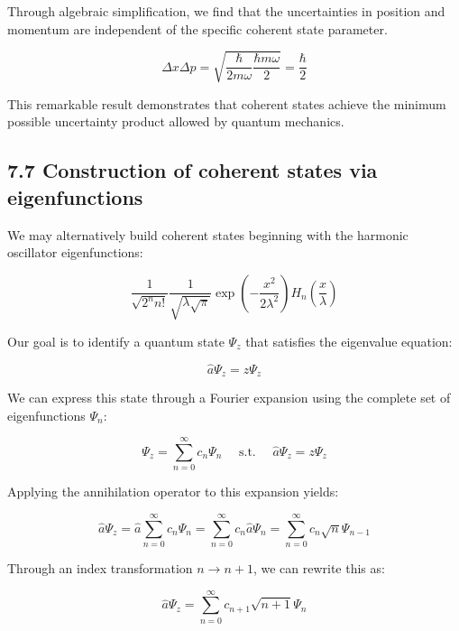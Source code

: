 \documentclass[italian]{HKNdocument}
\begin{document}
Through algebraic simplification, we find that the uncertainties in position and momentum are independent of the specific coherent state parameter.

\begin{equation*}
\Delta x \Delta p=\sqrt{\frac{\hbar}{2 m \omega} \frac{\hbar m \omega}{2}}=\frac{\hbar}{2} \tag{7.75}
\end{equation*}

This remarkable result demonstrates that coherent states achieve the minimum possible uncertainty product allowed by quantum mechanics.

\subsection*{7.7 Construction of coherent states via eigenfunctions}
We may alternatively build coherent states beginning with the harmonic oscillator eigenfunctions:

\begin{equation*}
\frac{1}{\sqrt{2^{n} n!}} \frac{1}{\sqrt{\lambda \sqrt{\pi}}} \exp \left(-\frac{x^{2}}{2 \lambda^{2}}\right) H_{n}\left(\frac{x}{\lambda}\right) \tag{7.76}
\end{equation*}

Our goal is to identify a quantum state $\Psi_{z}$ that satisfies the eigenvalue equation:

\begin{equation*}
\hat{a} \Psi_{z}=z \Psi_{z} \tag{7.77}
\end{equation*}

We can express this state through a Fourier expansion using the complete set of eigenfunctions $\Psi_{n}$:

\begin{equation*}
\Psi_{z}=\sum_{n=0}^{\infty} c_{n} \Psi_{n} \quad \text { s.t. } \quad \hat{a} \Psi_{z}=z \Psi_{z} \tag{7.78}
\end{equation*}

Applying the annihilation operator to this expansion yields:

\begin{equation*}
\hat{a} \Psi_{z}=\hat{a} \sum_{n=0}^{\infty} c_{n} \Psi_{n}=\sum_{n=0}^{\infty} c_{n} \hat{a} \Psi_{n}=\sum_{n=0}^{\infty} c_{n} \sqrt{n} \Psi_{n-1} \tag{7.79}
\end{equation*}

Through an index transformation $n \rightarrow n+1$, we can rewrite this as:

\begin{equation*}
\hat{a} \Psi_{z}=\sum_{n=0}^{\infty} c_{n+1} \sqrt{n+1} \Psi_{n} \tag{7.80}
\end{equation*}
\end{document}
